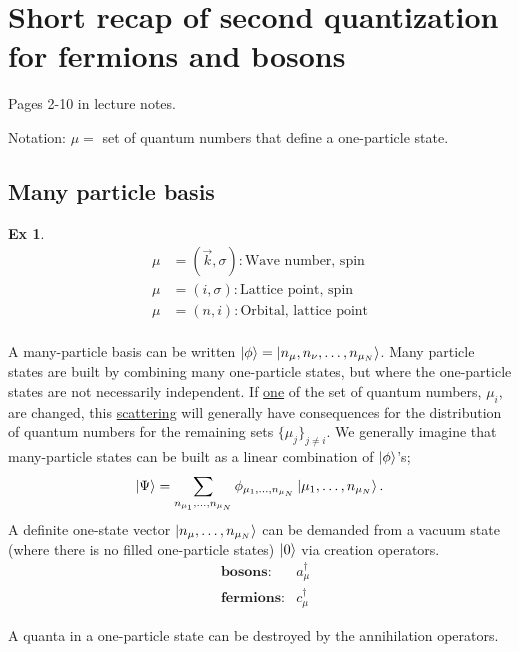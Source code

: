\section[Second quantization]{Short recap of second quantization for fermions and bosons}
Pages 2-10 in lecture notes.

Notation: $ \mu = $ set of quantum numbers that define a one-particle state.


\subsection{Many particle basis}
\newtheorem{theorem}{Ex}
\begin{theorem}


\begin{align*}
\mu &= (\vec{k}, \sigma):\text{Wave number, spin} \\
\mu &= (i, \sigma) : \text{Lattice point, spin} \\
\mu &= (n, i) : \text{Orbital, lattice point} \\
\end{align*}

\end{theorem}

A many-particle basis can be written $\ket{\phi} = \ket{n_{\mu}, n_{\nu}, \dots, n_{\mu_N}}$. Many particle states are built by combining many one-particle states, but where the one-particle states are not necessarily independent. If  \underline{one} of the set of quantum numbers, $\mu_i$, are changed, this \underline{scattering} will generally have consequences for the distribution of quantum numbers for the remaining sets $\{\mu_j\}_{j\ne i}$.
We generally imagine that many-particle states can be built as a linear combination of
$\ket{\phi}$'s;
\begin{equation}
\ket{\Psi} = \sum_{n_{\mu_1},\dots, n_{\mu_N}}\phi_{{\mu_1},\dots, n_{\mu_N}}\ket{{\mu_1},\dots, n_{\mu_N}}.
\end{equation}
A definite one-state vector $\ket{n_{\mu},\dots, n_{\mu_N}}$ can be demanded from a vacuum state (where there is no filled one-particle states) $\ket{0}$ via creation operators.
\begin{align*}
&\textbf{bosons}: &a_\mu^\dagger \\ 
&\textbf{fermions}: &c_\mu^\dagger
\end{align*}


A quanta in a one-particle state can be destroyed by the annihilation operators.

